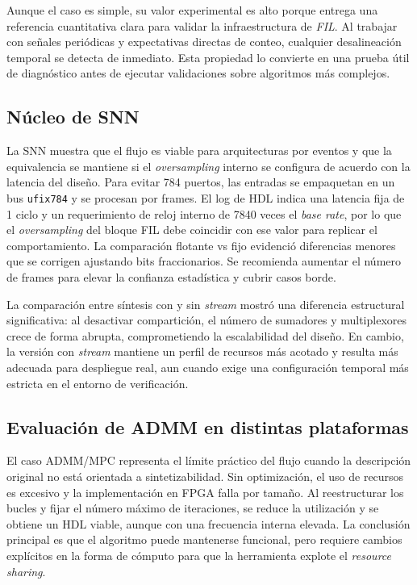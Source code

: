 Aunque el caso es simple, su valor experimental es alto porque entrega una referencia cuantitativa clara para validar la infraestructura de \textit{FIL}. Al trabajar con señales periódicas y expectativas directas de conteo, cualquier desalineación temporal se detecta de inmediato. Esta propiedad lo convierte en una prueba útil de diagnóstico antes de ejecutar validaciones sobre algoritmos más complejos.

\subsection{Núcleo de SNN}
La SNN muestra que el flujo es viable para arquitecturas por eventos y que la equivalencia se mantiene si el \textit{oversampling} interno se configura de acuerdo con la latencia del diseño. Para evitar 784 puertos, las entradas se empaquetan en un bus \texttt{ufix784} y se procesan por frames. El log de HDL indica una latencia fija de 1 ciclo y un requerimiento de reloj interno de 7840 veces el \textit{base rate}, por lo que el \textit{oversampling} del bloque FIL debe coincidir con ese valor para replicar el comportamiento. La comparación flotante vs fijo evidenció diferencias menores que se corrigen ajustando bits fraccionarios. Se recomienda aumentar el número de frames para elevar la confianza estadística y cubrir casos borde.

La comparación entre síntesis con y sin \textit{stream} mostró una diferencia estructural significativa: al desactivar compartición, el número de sumadores y multiplexores crece de forma abrupta, comprometiendo la escalabilidad del diseño. En cambio, la versión con \textit{stream} mantiene un perfil de recursos más acotado y resulta más adecuada para despliegue real, aun cuando exige una configuración temporal más estricta en el entorno de verificación.

\subsection{Evaluación de ADMM en distintas plataformas}
El caso ADMM/MPC representa el límite práctico del flujo cuando la descripción original no está orientada a sintetizabilidad. Sin optimización, el uso de recursos es excesivo y la implementación en FPGA falla por tamaño. Al reestructurar los bucles y fijar el número máximo de iteraciones, se reduce la utilización y se obtiene un HDL viable, aunque con una frecuencia interna elevada. La conclusión principal es que el algoritmo puede mantenerse funcional, pero requiere cambios explícitos en la forma de cómputo para que la herramienta explote el \textit{resource sharing}.


